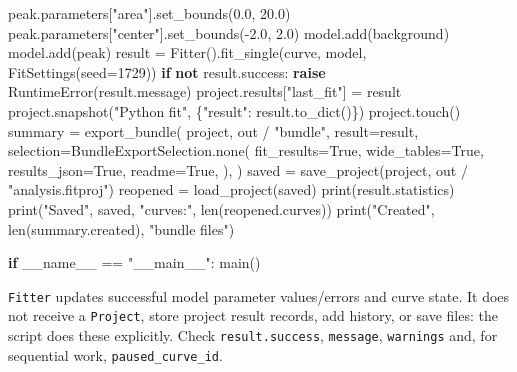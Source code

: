 \documentclass[
  10pt,
  a4paper,
  oneside]{scrreprt}
\newenvironment{Shaded}{}{}
\newcommand{\BuiltInTok}[1]{#1}
\newcommand{\ControlFlowTok}[1]{\textcolor[rgb]{0.00,0.44,0.13}{\textbf{#1}}}
\newcommand{\DecValTok}[1]{\textcolor[rgb]{0.25,0.63,0.44}{#1}}
\newcommand{\FloatTok}[1]{\textcolor[rgb]{0.25,0.63,0.44}{#1}}
\newcommand{\KeywordTok}[1]{\textcolor[rgb]{0.00,0.44,0.13}{\textbf{#1}}}
\newcommand{\NormalTok}[1]{#1}
\newcommand{\OperatorTok}[1]{\textcolor[rgb]{0.40,0.40,0.40}{#1}}
\newcommand{\PreprocessorTok}[1]{\textcolor[rgb]{0.74,0.48,0.00}{#1}}
\newcommand{\StringTok}[1]{\textcolor[rgb]{0.25,0.44,0.63}{#1}}
\newcommand{\VariableTok}[1]{\textcolor[rgb]{0.10,0.09,0.49}{#1}}
\begin{document}
\begin{Shaded}
\begin{Highlighting}[]
\NormalTok{    peak.parameters[}\StringTok{"area"}\NormalTok{].set\_bounds(}\FloatTok{0.0}\NormalTok{, }\FloatTok{20.0}\NormalTok{)}
\NormalTok{    peak.parameters[}\StringTok{"center"}\NormalTok{].set\_bounds(}\OperatorTok{{-}}\FloatTok{2.0}\NormalTok{, }\FloatTok{2.0}\NormalTok{)}
\NormalTok{    model.add(background)}
\NormalTok{    model.add(peak)}
\NormalTok{    result }\OperatorTok{=}\NormalTok{ Fitter().fit\_single(curve, model, FitSettings(seed}\OperatorTok{=}\DecValTok{1729}\NormalTok{))}
    \ControlFlowTok{if} \KeywordTok{not}\NormalTok{ result.success:}
        \ControlFlowTok{raise} \PreprocessorTok{RuntimeError}\NormalTok{(result.message)}
\NormalTok{    project.results[}\StringTok{"last\_fit"}\NormalTok{] }\OperatorTok{=}\NormalTok{ result}
\NormalTok{    project.snapshot(}\StringTok{"Python fit"}\NormalTok{, \{}\StringTok{"result"}\NormalTok{: result.to\_dict()\})}
\NormalTok{    project.touch()}
\NormalTok{    summary }\OperatorTok{=}\NormalTok{ export\_bundle(}
\NormalTok{        project, out }\OperatorTok{/} \StringTok{"bundle"}\NormalTok{, result}\OperatorTok{=}\NormalTok{result,}
\NormalTok{        selection}\OperatorTok{=}\NormalTok{BundleExportSelection.none(}
\NormalTok{            fit\_results}\OperatorTok{=}\VariableTok{True}\NormalTok{, wide\_tables}\OperatorTok{=}\VariableTok{True}\NormalTok{, results\_json}\OperatorTok{=}\VariableTok{True}\NormalTok{, readme}\OperatorTok{=}\VariableTok{True}\NormalTok{,}
\NormalTok{        ),}
\NormalTok{    )}
\NormalTok{    saved }\OperatorTok{=}\NormalTok{ save\_project(project, out }\OperatorTok{/} \StringTok{"analysis.fitproj"}\NormalTok{)}
\NormalTok{    reopened }\OperatorTok{=}\NormalTok{ load\_project(saved)}
    \BuiltInTok{print}\NormalTok{(result.statistics)}
    \BuiltInTok{print}\NormalTok{(}\StringTok{"Saved"}\NormalTok{, saved, }\StringTok{"curves:"}\NormalTok{, }\BuiltInTok{len}\NormalTok{(reopened.curves))}
    \BuiltInTok{print}\NormalTok{(}\StringTok{"Created"}\NormalTok{, }\BuiltInTok{len}\NormalTok{(summary.created), }\StringTok{"bundle files"}\NormalTok{)}


\ControlFlowTok{if} \VariableTok{\_\_name\_\_} \OperatorTok{==} \StringTok{"\_\_main\_\_"}\NormalTok{:}
\NormalTok{    main()}
\end{Highlighting}
\end{Shaded}

\texttt{Fitter} updates successful model parameter values/errors and
curve state. It does not receive a \texttt{Project}, store project
result records, add history, or save files: the script does these
explicitly. Check \texttt{result.success}, \texttt{message},
\texttt{warnings} and, for sequential work, \texttt{paused\_curve\_id}.
\end{document}
